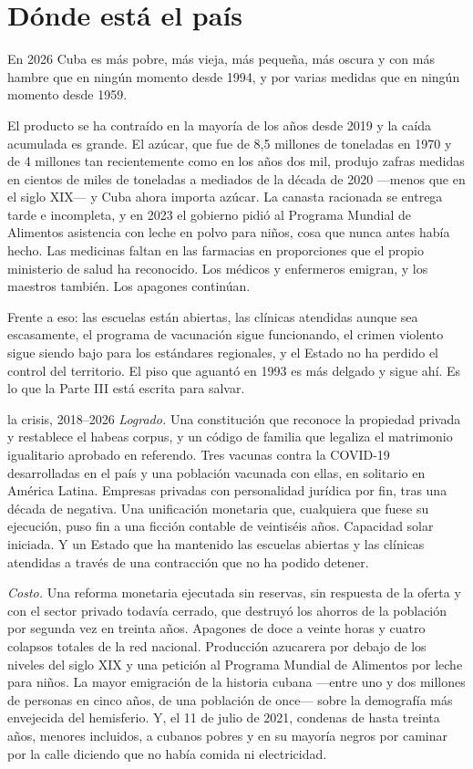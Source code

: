 \section{Dónde está el país}

En 2026 Cuba es más pobre, más vieja, más pequeña, más oscura y con más hambre que
en ningún momento desde 1994, y por varias medidas que en ningún momento desde
1959.

El producto se ha contraído en la mayoría de los años desde 2019 y la caída
acumulada es grande.\unv{} El azúcar, que fue de 8,5 millones de toneladas en 1970
y de 4 millones tan recientemente como en los años dos mil, produjo zafras medidas
en cientos de miles de toneladas a mediados de la década de 2020 ---menos que en el
siglo XIX--- y Cuba ahora importa azúcar.\unv{} La canasta racionada se entrega
tarde e incompleta, y en 2023 el gobierno pidió al Programa Mundial de Alimentos
asistencia con leche en polvo para niños, cosa que nunca antes había
hecho.\unv{} Las medicinas faltan en las farmacias en proporciones que el propio
ministerio de salud ha reconocido. Los médicos y enfermeros emigran, y los maestros
también. Los apagones continúan.

Frente a eso: las escuelas están abiertas, las clínicas atendidas aunque sea
escasamente, el programa de vacunación sigue funcionando, el crimen violento sigue
siendo bajo para los estándares regionales, y el Estado no ha perdido el control
del territorio. El piso que aguantó en 1993 es más delgado y sigue ahí. Es lo que
la Parte III está escrita para salvar.

\begin{ledger}{la crisis, 2018--2026}
\emph{Logrado.} Una constitución que reconoce la propiedad privada y restablece el
habeas corpus, y un código de familia que legaliza el matrimonio igualitario
aprobado en referendo. Tres vacunas contra la COVID-19 desarrolladas en el país y
una población vacunada con ellas, en solitario en América Latina. Empresas privadas
con personalidad jurídica por fin, tras una década de negativa. Una unificación
monetaria que, cualquiera que fuese su ejecución, puso fin a una ficción contable
de veintiséis años. Capacidad solar iniciada. Y un Estado que ha mantenido las
escuelas abiertas y las clínicas atendidas a través de una contracción que no ha
podido detener.

\emph{Costo.} Una reforma monetaria ejecutada sin reservas, sin respuesta de la
oferta y con el sector privado todavía cerrado, que destruyó los ahorros de la
población por segunda vez en treinta años. Apagones de doce a veinte horas y cuatro
colapsos totales de la red nacional. Producción azucarera por debajo de los niveles
del siglo XIX y una petición al Programa Mundial de Alimentos por leche para niños.
La mayor emigración de la historia cubana ---entre uno y dos millones de personas en
cinco años, de una población de once--- sobre la demografía más envejecida del
hemisferio. Y, el 11 de julio de 2021, condenas de hasta treinta años, menores
incluidos, a cubanos pobres y en su mayoría negros por caminar por la calle diciendo
que no había comida ni electricidad.
\end{ledger}

